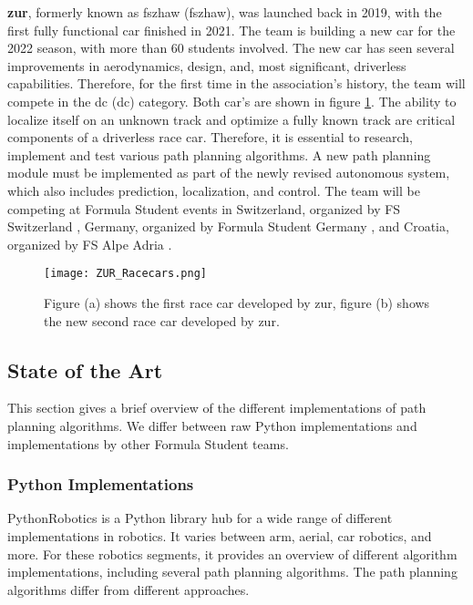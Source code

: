 \textbf{\acrlong{zur}}, formerly known as \acrlong{fszhaw} (\acrshort{fszhaw}), was launched back in 2019, with the first fully functional car finished in 2021. The team is building a new car for the 2022 season, with more than 60 students involved. The new car has seen several improvements in aerodynamics, design, and, most significant, driverless capabilities. \cite{fszhaw_launch}
Therefore, for the first time in the association's history, the team will compete in the \acrlong{dc} (\acrshort{dc}) category. Both car's are shown in figure \ref{fig:ZUR Racecars}.
The ability to localize itself on an unknown track and optimize a fully known track are critical components of a driverless race car. Therefore, it is essential to research, implement and test various path planning algorithms. A new path planning module must be implemented as part of the newly revised autonomous system, which also includes prediction, localization, and control.
The team will be competing at Formula Student events in Switzerland, organized by FS Switzerland \cite{fsswitzerland}, Germany, organized by Formula Student Germany \cite{fs_germany}, and Croatia, organized by FS Alpe Adria \cite{fs_alpe_adria}.
\begin{figure}[H]
    \centering
    \texttt{[image: ZUR\_Racecars.png]}
    \caption{Figure (a) shows the first race car developed by \acrshort{zur}, figure (b) shows the new second race car developed by \acrshort{zur}.}
    \label{fig:ZUR Racecars}
\end{figure}

\subsection{State of the Art} \label{sec:State of the Art}
This section gives a brief overview of the different implementations of path planning algorithms. We differ between raw Python implementations and implementations by other Formula Student teams.

\subsubsection{Python Implementations} \label{sec:Python Implementations}
PythonRobotics is a Python library hub for a wide range of different implementations in robotics. It varies between arm, aerial, car robotics, and more.
For these robotics segments, it provides an overview of different algorithm implementations, including several path planning algorithms.
The path planning algorithms differ from different approaches.
\cite{python_robotics}

